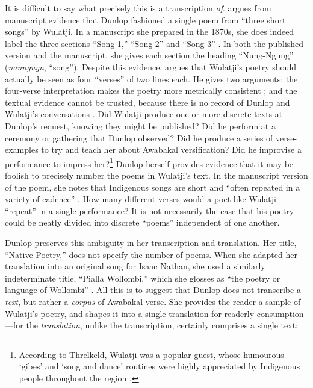 \documentclass[
  Crown,
  times,
  sageh]{sagej}
\begin{document}
It is difficult to say what precisely this is a transcription \emph{of}.
\citet[92]{oleary_giving_2004} argues from manuscript evidence that
Dunlop fashioned a single poem from ``three short songs'' by Wulatji. In
a manuscript she prepared in the 1870s, she does indeed label the three
sections ``Song 1,'' ``Song 2'' and ``Song 3'' \citetext{\citealp[image
60]{dunlop_vase_nodate}; \citealp[printed
in][194]{dunlop_selection_2021}}. In both the published version and the
manuscript, she gives each section the heading ``Nung-Ngung''
(\emph{nannguyn}, ``song''). Despite this evidence,
\citet{wafer_ghost-writing_2017} argues that Wulatji's poetry should
actually be seen as four ``verses'' of two lines each. He gives two
arguments: the four-verse interpretation makes the poetry more
metrically consistent \citeyearpar[204]{wafer_ghost-writing_2017}; and
the textual evidence cannot be trusted, because there is no record of
Dunlop and Wulatji's conversations
\citeyearpar[202]{wafer_ghost-writing_2017}. Did Wulatji produce one or
more discrete texts at Dunlop's request, knowing they might be
published? Did he perform at a ceremony or gathering that Dunlop
observed? Did he produce a series of verse-examples to try and teach her
about Awabakal versification? Did he improvise a performance to impress
her?\footnote{According to Threlkeld, Wulatji was a popular guest, whose
  humourous `gibes' and `song and dance' routines were highly
  appreciated by Indigenous people throughout the region \citep[quoted
  in][200]{wafer_ghost-writing_2017}.} Dunlop herself provides evidence
that it may be foolish to precisely number the poems in Wulatji's text.
In the manuscript version of the poem, she notes that Indigenous songs
are short and ``often repeated in a variety of cadence''
\citeyearpar[194]{dunlop_selection_2021}. How many different verses
would a poet like Wulatji ``repeat'' in a single performance? It is not
necessarily the case that his poetry could be neatly divided into
discrete ``poems'' independent of one another.

Dunlop preserves this ambiguity in her transcription and translation.
Her title, ``Native Poetry,'' does not specify the number of poems. When
she adapted her translation into an original song for Isaac Nathan, she
used a similarly indeterminate title, ``Pialla Wollombi,'' which she
glosses as ``the poetry or language of Wollombi''
\citep{dunlop_pialla_1848}. All this is to suggest that Dunlop does not
transcribe a \emph{text}, but rather a \emph{corpus} of Awabakal verse.
She provides the reader a sample of Wulatji's poetry, and shapes it into
a single translation for readerly consumption---for the
\emph{translation}, unlike the transcription, certainly comprises a
single text:
\end{document}
